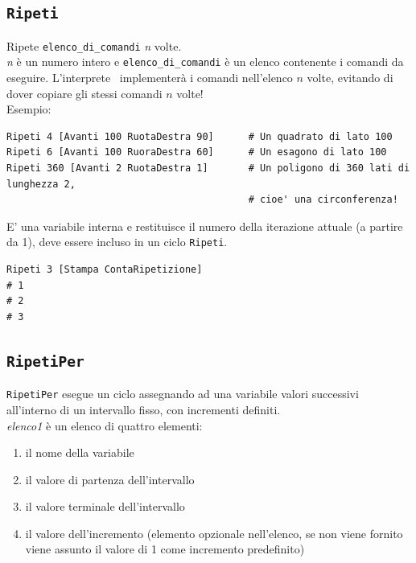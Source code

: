\subsection{\texttt{Ripeti}}
\noindent 
{} 
Ripete \texttt{elenco\_di\_comandi} \textit{n} volte.\\
\textit{n} è un numero intero e \texttt{elenco\_di\_comandi} è un elenco contenente i comandi da eseguire. L'interprete \logo\ implementerà i comandi nell'elenco $n$ volte, evitando di dover copiare gli stessi comandi $n$ volte!\\
Esempio:
\begin{lstlisting}[caption="Cicli per disegnare poligoni regolari"]
Ripeti 4 [Avanti 100 RuotaDestra 90]      # Un quadrato di lato 100
Ripeti 6 [Avanti 100 RuoraDestra 60]      # Un esagono di lato 100
Ripeti 360 [Avanti 2 RuotaDestra 1]       # Un poligono di 360 lati di lunghezza 2, 
                                          # cioe' una circonferenza!
\end{lstlisting}
\noindent

E' una variabile interna e restituisce il numero della iterazione attuale (a partire da 1), deve essere incluso in un ciclo \texttt{Ripeti}.

\begin{lstlisting}[caption="Esempio di uso di \texttt{ContaRipetizione}"]
Ripeti 3 [Stampa ContaRipetizione]
# 1
# 2
# 3
\end{lstlisting}


\subsection{\texttt{RipetiPer}}
\noindent 

\texttt{RipetiPer} esegue un ciclo assegnando ad una variabile valori successivi all'interno di un intervallo fisso, con incrementi definiti.\\
\textit{elenco1} è un elenco di quattro elementi:
\begin{enumerate}
	\item il nome della variabile
	\item il valore di partenza dell'intervallo
	\item il valore terminale dell'intervallo
	\item il valore dell'incremento (elemento opzionale nell'elenco, se non viene fornito viene assunto il valore di 1 come incremento predefinito)
\end{enumerate}


